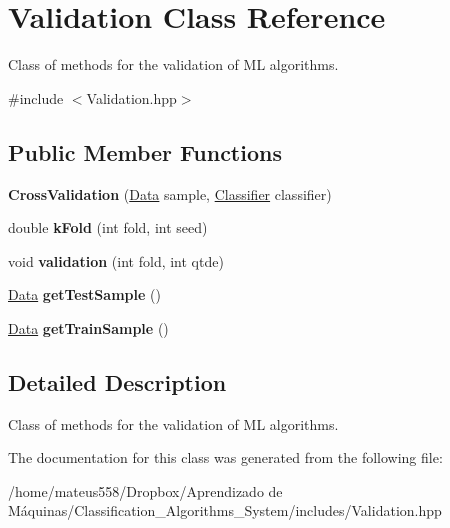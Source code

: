 \hypertarget{class_validation}{}\section{Validation Class Reference}
\label{class_validation}


Class of methods for the validation of ML algorithms.  




{\ttfamily \#include $<$Validation.\+hpp$>$}

\subsection*{Public Member Functions}
\begin{DoxyCompactItemize}
\item 
\mbox{\label{class_validation_ab58bb5bc64a10f5c8260b8bbadd5e9ce}} 
{\bfseries Cross\+Validation} (\hyperlink{class_data}{Data} sample, \hyperlink{class_classifier}{Classifier} classifier)
\item 
\mbox{\label{class_validation_a3aae72caef37b12a57aaf5cdd862de3a}} 
double {\bfseries k\+Fold} (int fold, int seed)
\item 
\mbox{\label{class_validation_a166305aa3f117b119da69d54778286a0}} 
void {\bfseries validation} (int fold, int qtde)
\item 
\mbox{\label{class_validation_a6ef1b8600535a064b9a94507afdf849c}} 
\hyperlink{class_data}{Data} {\bfseries get\+Test\+Sample} ()
\item 
\mbox{\label{class_validation_a656f4919ec48a7f26063d046d583433a}} 
\hyperlink{class_data}{Data} {\bfseries get\+Train\+Sample} ()
\end{DoxyCompactItemize}


\subsection{Detailed Description}
Class of methods for the validation of ML algorithms. 

The documentation for this class was generated from the following file\+:\begin{DoxyCompactItemize}
\item 
/home/mateus558/\+Dropbox/\+Aprendizado de Máquinas/\+Classification\+\_\+\+Algorithms\+\_\+\+System/includes/Validation.\+hpp\end{DoxyCompactItemize}

